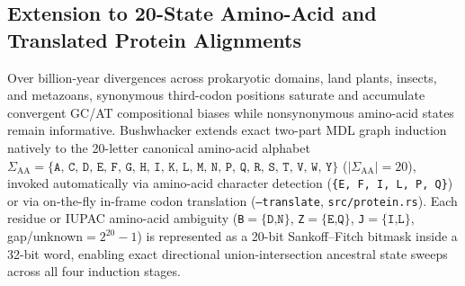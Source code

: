 \documentclass[11pt,a4paper]{article}
\begin{document}
\subsection{Extension to 20-State Amino-Acid and Translated Protein Alignments}

Over billion-year divergences across prokaryotic domains, land plants, insects, and metazoans, synonymous third-codon positions saturate and accumulate convergent GC/AT compositional biases while nonsynonymous amino-acid states remain informative. Bushwhacker extends exact two-part MDL graph induction natively to the 20-letter canonical amino-acid alphabet $\Sigma_{\text{AA}} = \{\texttt{A, C, D, E, F, G, H, I, K, L, M, N, P, Q, R, S, T, V, W, Y}\}$ ($|\Sigma_{\text{AA}}| = 20$), invoked automatically via amino-acid character detection (\texttt{\{E, F, I, L, P, Q\}}) or via on-the-fly in-frame codon translation (\texttt{--translate}, \texttt{src/protein.rs}). Each residue or IUPAC amino-acid ambiguity (\texttt{B}$=\{\texttt{D,N}\}$, \texttt{Z}$=\{\texttt{E,Q}\}$, \texttt{J}$=\{\texttt{I,L}\}$, gap/unknown$=2^{20}-1$) is represented as a 20-bit Sankoff--Fitch bitmask inside a 32-bit word, enabling exact directional union-intersection ancestral state sweeps across all four induction stages.
\end{document}
